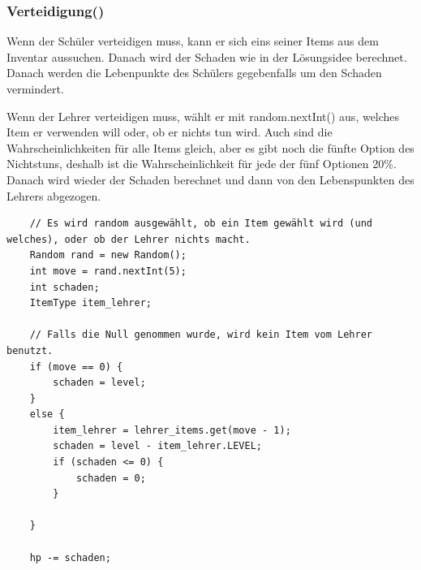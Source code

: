 \subsubsection{Verteidigung()}

Wenn der Schüler verteidigen muss, kann er sich eins seiner Items aus dem Inventar aussuchen. Danach wird der Schaden wie in der Lösungsidee berechnet. Danach werden die Lebenpunkte des Schülers gegebenfalls um den Schaden vermindert.\par
Wenn der Lehrer verteidigen muss, wählt er mit random.nextInt() aus, welches Item er verwenden will oder, ob er nichts tun wird. Auch sind die Wahrscheinlichkeiten für alle Items gleich, aber es gibt noch die fünfte Option des Nichtstuns, deshalb ist die Wahrscheinlichkeit für jede der fünf Optionen 20\%. Danach wird wieder der Schaden berechnet und dann von den Lebenspunkten des Lehrers abgezogen. 
\begin{lstlisting}
	// Es wird random ausgewählt, ob ein Item gewählt wird (und welches), oder ob der Lehrer nichts macht.
	Random rand = new Random();
	int move = rand.nextInt(5);
	int schaden;
	ItemType item_lehrer;
	
	// Falls die Null genommen wurde, wird kein Item vom Lehrer benutzt.
	if (move == 0) {
		schaden = level;
	}
	else {
		item_lehrer = lehrer_items.get(move - 1);
		schaden = level - item_lehrer.LEVEL;
		if (schaden <= 0) {
			schaden = 0;
		}
		
	}
	
	hp -= schaden;
\end{lstlisting}
